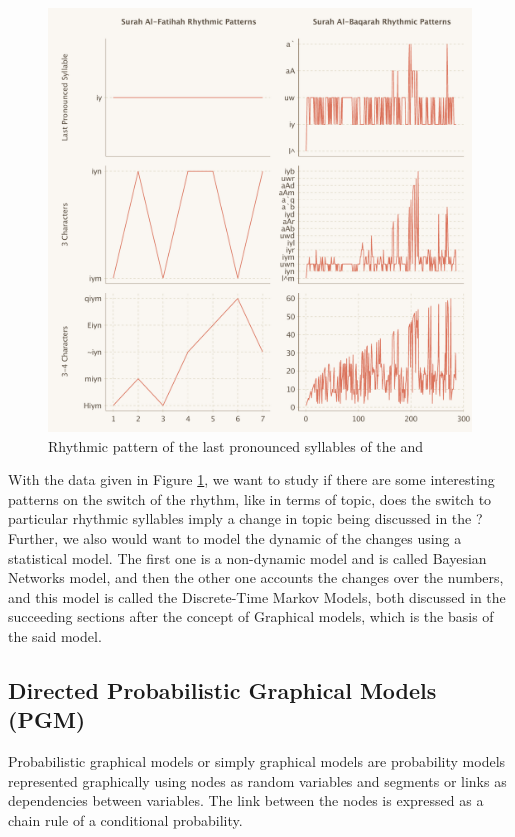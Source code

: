 \begin{figure}[!t]
    \includegraphics[width=\textwidth]{img/plot_rhythmic1.pdf}
    \caption{Rhythmic pattern of the last pronounced syllables of the   and  }
    \label{fig:fatihah_baqarah_rhythmic_method}
\end{figure}

With the data given in Figure \ref{fig:fatihah_baqarah_rhythmic_method}, we want to study if there are some interesting patterns on the switch of the rhythm, like in terms of topic, does the switch to particular rhythmic syllables imply a change in topic being discussed in the  ? Further, we also would want to model the dynamic of the changes using a statistical model. The first one is a non-dynamic model and is called Bayesian Networks model, and then the other one accounts the changes over the   numbers, and this model is called the Discrete-Time Markov Models, both discussed in the succeeding sections after the concept of Graphical models, which is the basis of the said model.
\subsection{Directed Probabilistic Graphical Models (PGM)}
Probabilistic graphical models or simply graphical models are probability models represented graphically using nodes as random variables and segments or links as dependencies between variables. The link between the nodes is expressed as a chain rule of a conditional probability.

